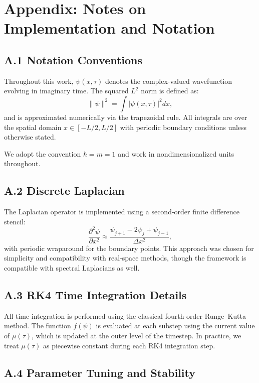 \documentclass[12pt]{article}
\begin{document}
\newpage
\appendix

\section{Appendix: Notes on Implementation and Notation}

\subsection*{A.1 Notation Conventions}

Throughout this work, $\psi(x,\tau)$ denotes the complex-valued wavefunction evolving in imaginary time. The squared $L^2$ norm is defined as:
\[
\|\psi\|^2 = \int |\psi(x,\tau)|^2 dx,
\]
and is approximated numerically via the trapezoidal rule. All integrals are over the spatial domain $x \in [-L/2, L/2]$ with periodic boundary conditions unless otherwise stated.

We adopt the convention $\hbar = m = 1$ and work in nondimensionalized units throughout.

\subsection*{A.2 Discrete Laplacian}

The Laplacian operator is implemented using a second-order finite difference stencil:
\[
\frac{\partial^2 \psi}{\partial x^2} \approx \frac{\psi_{j+1} - 2\psi_j + \psi_{j-1}}{\Delta x^2},
\]
with periodic wraparound for the boundary points. This approach was chosen for simplicity and compatibility with real-space methods, though the framework is compatible with spectral Laplacians as well.

\subsection*{A.3 RK4 Time Integration Details}

All time integration is performed using the classical fourth-order Runge--Kutta method. The function $f(\psi)$ is evaluated at each substep using the current value of $\mu(\tau)$, which is updated at the outer level of the timestep. In practice, we treat $\mu(\tau)$ as piecewise constant during each RK4 integration step.

\subsection*{A.4 Parameter Tuning and Stability}
\end{document}
